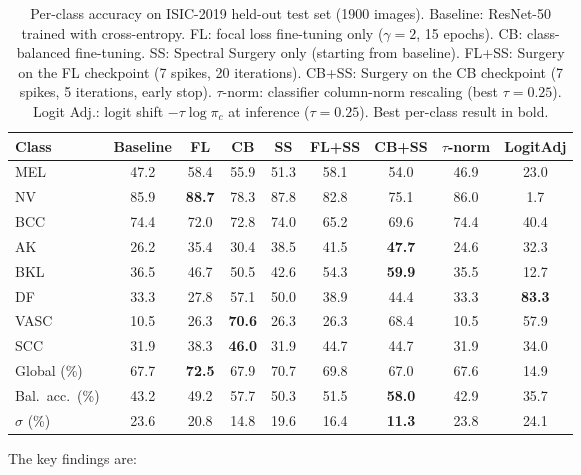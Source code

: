 \documentclass[11pt,a4paper]{article}
\begin{document}
\begin{table}[ht]
\centering
\small
\caption{Per-class accuracy on ISIC-2019 held-out test set
(1900 images). Baseline: ResNet-50 trained with cross-entropy.
FL: focal loss fine-tuning only ($\gamma = 2$, 15 epochs).
CB: class-balanced fine-tuning. SS: Spectral Surgery only
(starting from baseline). FL+SS: Surgery on the FL checkpoint
(7 spikes, 20 iterations). CB+SS: Surgery on the CB checkpoint
(7 spikes, 5 iterations, early stop). $\tau$-norm: classifier
column-norm rescaling (best $\tau = 0.25$). Logit Adj.: logit shift
$-\tau\log\pi_c$ at inference ($\tau = 0.25$). Best per-class
result in bold.}
\label{tab:isic-results}
\begin{tabular}{lcccccccc}
\toprule
Class & Baseline & FL & CB & SS & FL+SS & CB+SS & $\tau$-norm & LogitAdj \\
\midrule
MEL   & 47.2 & 58.4 & 55.9 & 51.3 & 58.1 & 54.0 & 46.9 & 23.0 \\
NV    & 85.9 & \textbf{88.7} & 78.3 & 87.8 & 82.8 & 75.1 & 86.0 &  1.7 \\
BCC   & 74.4 & 72.0 & 72.8 & 74.0 & 65.2 & 69.6 & 74.4 & 40.4 \\
AK    & 26.2 & 35.4 & 30.4 & 38.5 & 41.5 & \textbf{47.7} & 24.6 & 32.3 \\
BKL   & 36.5 & 46.7 & 50.5 & 42.6 & 54.3 & \textbf{59.9} & 35.5 & 12.7 \\
DF    & 33.3 & 27.8 & 57.1 & 50.0 & 38.9 & 44.4 & 33.3 & \textbf{83.3} \\
VASC  & 10.5 & 26.3 & \textbf{70.6} & 26.3 & 26.3 & 68.4 & 10.5 & 57.9 \\
SCC   & 31.9 & 38.3 & \textbf{46.0} & 31.9 & 44.7 & 44.7 & 31.9 & 34.0 \\
\midrule
Global (\%)     & 67.7 & \textbf{72.5} & 67.9 & 70.7 & 69.8 & 67.0 & 67.6 & 14.9 \\
Bal.\ acc.\ (\%)& 43.2 & 49.2 & 57.7 & 50.3 & 51.5 & \textbf{58.0} & 42.9 & 35.7 \\
$\sigma$ (\%)   & 23.6 & 20.8 & 14.8 & 19.6 & 16.4 & \textbf{11.3} & 23.8 & 24.1 \\
\bottomrule
\end{tabular}
\end{table}

The key findings are:
\end{document}
